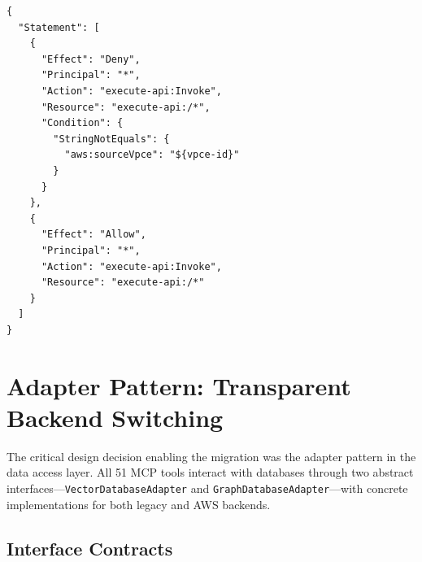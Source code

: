 \documentclass[11pt,letterpaper]{article}
\begin{document}
\begin{lstlisting}[caption={API Gateway resource policy (Deny-first pattern).}]
{
  "Statement": [
    {
      "Effect": "Deny",
      "Principal": "*",
      "Action": "execute-api:Invoke",
      "Resource": "execute-api:/*",
      "Condition": {
        "StringNotEquals": {
          "aws:sourceVpce": "${vpce-id}"
        }
      }
    },
    {
      "Effect": "Allow",
      "Principal": "*",
      "Action": "execute-api:Invoke",
      "Resource": "execute-api:/*"
    }
  ]
}
\end{lstlisting}


\section{Adapter Pattern: Transparent Backend Switching}
\label{sec:adapter}

The critical design decision enabling the migration was the adapter pattern
in the data access layer. All 51 MCP tools interact with databases through
two abstract interfaces---\texttt{VectorDatabaseAdapter} and
\texttt{GraphDatabaseAdapter}---with concrete implementations for both
legacy and AWS backends.

\subsection{Interface Contracts}
\end{document}
